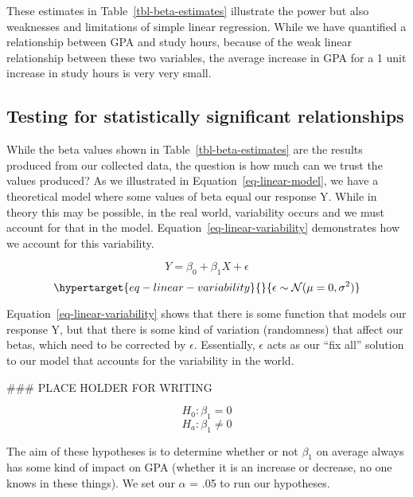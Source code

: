 \documentclass[
  letterpaper,
  DIV=11,
  numbers=noendperiod]{scrreprt}
\newenvironment{Shaded}{\begin{snugshade}}{\end{snugshade}}
\newcommand{\CommentTok}[1]{\textcolor[rgb]{0.37,0.37,0.37}{#1}}
\begin{document}
These estimates in Table~\ref{tbl-beta-estimates} illustrate the power
but also weaknesses and limitations of simple linear regression. While
we have quantified a relationship between GPA and study hours, because
of the weak linear relationship between these two variables, the average
increase in GPA for a 1 unit increase in study hours is very very small.

\hypertarget{testing-for-statistically-significant-relationships}{%
\subsection{Testing for statistically significant
relationships}\label{testing-for-statistically-significant-relationships}}

While the beta values shown in Table~\ref{tbl-beta-estimates} are the
results produced from our collected data, the question is how much can
we trust the values produced? As we illustrated in
Equation~\ref{eq-linear-model}, we have a theoretical model where some
values of beta equal our response Y. While in theory this may be
possible, in the real world, variability occurs and we must account for
that in the model. Equation~\ref{eq-linear-variability} demonstrates how
we account for this variability.

\[
Y = \beta_0 + \beta_1X + \epsilon
\] \begin{equation}\protect\hypertarget{eq-linear-variability}{}{
\epsilon \sim \mathcal{N}(\mu=0, \sigma^2)
}\label{eq-linear-variability}\end{equation}

Equation~\ref{eq-linear-variability} shows that there is some function
that models our response Y, but that there is some kind of variation
(randomness) that affect our betas, which need to be corrected by
\(\epsilon\). Essentially, \(\epsilon\) acts as our ``fix all'' solution
to our model that accounts for the variability in the world.

\begin{Shaded}
\begin{Highlighting}[]
\CommentTok{\#\#\# PLACE HOLDER FOR WRITING}
\end{Highlighting}
\end{Shaded}

\[
H_0: \beta_1 = 0
\] \[
H_a: \beta_1 \neq 0
\]

The aim of these hypotheses is to determine whether or not \(\beta_1\)
on average always has some kind of impact on GPA (whether it is an
increase or decrease, no one knows in these things). We set our
\(\alpha\) = .05 to run our hypotheses.
\end{document}
